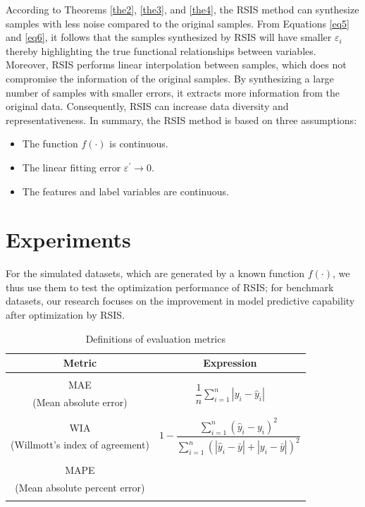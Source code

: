 \documentclass[final,3p,times]{elsarticle}
\begin{document}
According to Theorems \ref{the2}, \ref{the3}, and \ref{the4}, 
the RSIS method can synthesize samples with less noise compared
 to the original samples. From Equations \eqref{eq5} and 
 \eqref{eq6}, it follows that the samples synthesized by RSIS 
 will have smaller $\varepsilon_i$ thereby highlighting the 
 true functional relationships between variables. Moreover, 
 RSIS performs linear interpolation between samples, which 
 does not compromise the information of the original samples.
  By synthesizing a large number of samples with smaller 
  errors, it extracts more information from the original data. 
  Consequently, RSIS can increase data diversity and 
  representativeness. In summary, the RSIS method 
  is based on three assumptions:


\begin{itemize}
  \item The function $f(\cdot)$ is continuous.
  \item The linear fitting error $\varepsilon^\prime\rightarrow0$.
  \item The features and label variables are continuous.
\end{itemize}



\section{Experiments}
For the simulated datasets, which are generated by a known 
function $f(\cdot)$, we thus use them to test the optimization 
performance of RSIS; for benchmark datasets, our research focuses 
on the improvement in model predictive capability after 
optimization by RSIS.

\begin{table}[b!]
  \centering
  \begin{threeparttable}
  \caption{Definitions of evaluation metrics \label{tab1}}
  \begin{tabular}{cc}
  \toprule
  Metric & Expression \\
  \midrule
   & \multirow{4}{*}{$\dfrac{1}{n} \sum_{i=1}^{n} \left| y_i - \hat{y}_i \right|$} \\
  MAE & \\
  (Mean absolute error) & \\
   & \\
   & \multirow{4}{*}{$1 - \dfrac{\sum_{i=1}^{n}(\hat{y}_i - y_i)^2}{\sum_{i=1}^{n}(\left|\hat{y}_i - \bar{y}\right| + \left|y_i - \bar{y}\right|)^2}$} \\
  WIA & \\
  (Willmott's index of agreement) & \\
   & \\ 
   & {\multirow{4}{*}{$\dfrac{1}{n} \sum_{i=1}^{n} \left| \dfrac{y_i - \hat{y}_i}{y_i+0.01} \right|$}} \\
  MAPE & \\
  (Mean absolute percent error) & \\
  & \\
  \bottomrule
  \end{tabular}
\end{threeparttable}
\end{table}
\end{document}
